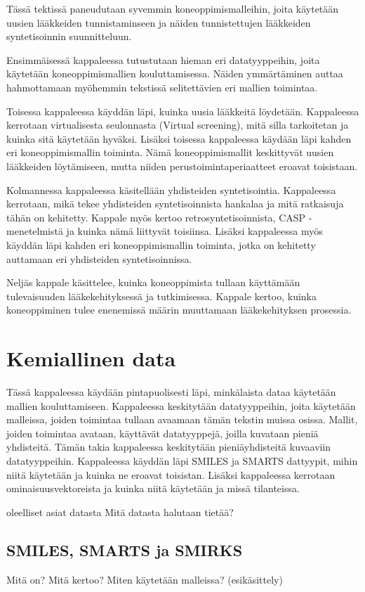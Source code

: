 \documentclass[finnish,twoside,censored,tkt,sw-line]{HYthesisML}
\begin{document}
Tässä tektissä paneudutaan syvemmin koneoppimismalleihin, joita käytetään uusien lääkkeiden tunnistaminseen ja näiden tunnistettujen lääkkeiden syntetisoinnin suunnitteluun.

Ensimmäisessä kappaleessa tutustutaan hieman eri datatyyppeihin, joita käytetään koneoppimismallien kouluttamisessa.
Näiden ymmärtäminen auttaa hahmottamaan myöhemmin tekstissä selitettävien eri mallien toimintaa.

Toisessa kappaleessa käyddän läpi, kuinka uusia lääkkeitä löydetään.
Kappaleessa kerrotaan virtualisesta seulonnasta (Virtual screening), mitä silla tarkoitetan ja kuinka sitä käytetään hyväksi.
Lisäksi toisessa kappaleessa käydään läpi kahden eri koneoppimismallin toiminta.
Nämä koneoppimismallit keskittyvät uusien lääkkeiden löytämiseen, mutta niiden perustoimintaperiaatteet eroavat toisistaan.

Kolmannessa kappaleessa käsitellään yhdisteiden syntetisointia.
Kappaleessa kerrotaan, mikä tekee yhdisteiden syntetisoinnista hankalaa ja mitä ratkaisuja tähän on kehitetty.
Kappale myös kertoo retrosyntetisoinnista, CASP -menetelmistä ja kuinka nämä liittyvät toisiinsa.
Lisäksi kappaleessa myös käyddän läpi kahden eri koneoppimismallin toiminta, jotka on kehitetty auttamaan eri yhdisteiden syntetisoinnissa.

Neljäs kappale käsittelee, kuinka koneoppimista tullaan käyttämään tulevaisuuden lääkekehityksessä ja tutkimisessa.
Kappale kertoo, kuinka koneoppiminen tulee enenemissä määrin muuttamaan lääkekehityksen prosessia.

\chapter{Kemiallinen data}

Tässä kappaleessa käydään pintapuolisesti läpi, minkälaista dataa käytetään mallien kouluttamiseen.
Kappaleessa keskitytään datatyyppeihin, joita käytetään malleissa, joiden toimintaa tullaan avaamaan tämän tekstin muissa osissa.
Mallit, joiden toimintaa avataan, käyttävät datatyyppejä, joilla kuvataan pieniä yhdisteitä.
Tämän takia kappaleessa keskitytään pieniäyhdisteitä kuvaaviin datatyyppeihin.
Kappaleessa käyddän läpi SMILES ja SMARTS dattyypit, mihin niitä käytetään ja kuinka ne eroavat toisistan.
Lisäksi kappaleessa kerrotaan ominaisuusvektoreista ja kuinka niitä käytetään ja missä tilanteissa.

oleelliset asiat datasta
Mitä datasta halutaan tietää?

\section{SMILES, SMARTS ja SMIRKS}
Mitä on?
Mitä kertoo?
Miten käytetään malleissa? (esikäsittely)
\end{document}
